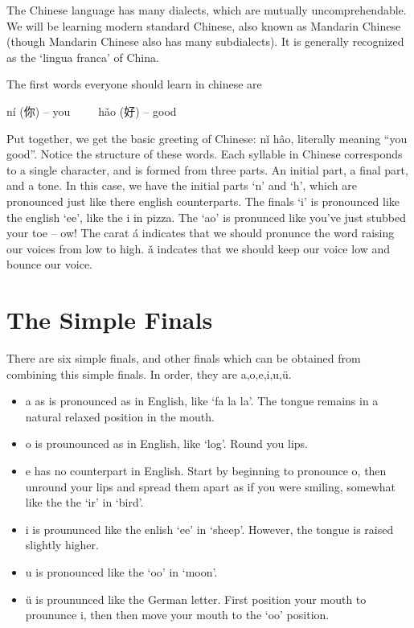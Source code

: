 \documentclass{article}
\begin{document}
The Chinese language has many dialects, which are mutually uncomprehendable. We will be learning modern standard Chinese, also known as Mandarin Chinese (though Mandarin Chinese also has many subdialects). It is generally recognized as the `lingua franca' of China.

The first words everyone should learn in chinese are
%
\begin{center}
    n\'{i} (你) -- you\ \ \ \ \ h\v{a}o (好) -- good
\end{center}
%
Put together, we get the basic greeting of Chinese: n\v{i} h\^{a}o, literally meaning ``you good''. Notice the structure of these words. Each syllable in Chinese corresponds to a single character, and is formed from three parts. An initial part, a final part, and a tone. In this case, we have the initial parts `n' and `h', which are pronounced just like there english counterparts. The finals `i' is pronounced like the english `ee', like the i in pizza. The `ao' is pronunced like you've just stubbed your toe -- ow! The carat \'{a} indicates that we should pronunce the word raising our voices from low to high. \v{a} indcates that we should keep our voice low and bounce our voice.

\section{The Simple Finals}

There are six simple finals, and other finals which can be obtained from combining this simple finals. In order, they are a,o,e,i,u,\"{u}.

\begin{itemize}
    \item a as is pronounced as in English, like `fa la la'. The tongue remains in a natural relaxed position in the mouth.
    \item o is prounounced as in English, like `log'. Round you lips.
    \item e has no counterpart in English. Start by beginning to pronounce o, then unround your lips and spread them apart as if you were smiling, somewhat like the the `ir' in `bird'.
    \item i is proununced like the enlish `ee' in `sheep'. However, the tongue is raised slightly higher.
    \item u is pronounced like the `oo' in `moon'.
    \item \"{u} is proununced like the German letter. First position your mouth to proununce i, then then move your mouth to the `oo' position.
\end{itemize}
\end{document}
